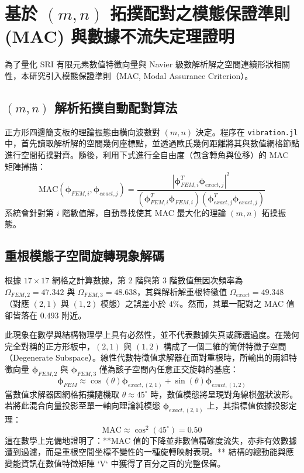 \section{基於 $(m,n)$ 拓撲配對之模態保證準則 (MAC) 與數據不流失定理證明}

為了量化 SRI 有限元素數值特徵向量與 Navier 級數解析解之空間連續形狀相關性，本研究引入模態保證準則（MAC, Modal Assurance Criterion）。

\subsection{$(m,n)$ 解析拓撲自動配對算法}
正方形四邊簡支板的理論振態由橫向波數對 $(m,n)$ 決定。程序在 \texttt{vibration.jl} 中，首先讀取解析解的空間幾何座標點，並透過歐氏幾何距離將其與數值網格節點進行空間拓撲對齊。隨後，利用下式進行全自由度（包含轉角與位移）的 MAC 矩陣掃描：
\begin{equation}
\text{MAC}(\boldsymbol{\phi}_{FEM, i}, \boldsymbol{\phi}_{exact, j}) = \frac{|\boldsymbol{\phi}_{FEM, i}^T \boldsymbol{\phi}_{exact, j}|^2}{(\boldsymbol{\phi}_{FEM, i}^T \boldsymbol{\phi}_{FEM, i})(\boldsymbol{\phi}_{exact, j}^T \boldsymbol{\phi}_{exact, j})}
\end{equation}
系統會針對第 $i$ 階數值解，自動尋找使其 MAC 最大化的理論 $(m,n)$ 拓撲振態。



\subsection{重根模態子空間旋轉現象解碼}
根據 $17 \times 17$ 網格之計算數據，第 2 階與第 3 階數值無因次頻率為 $\Omega_{FEM,2}=47.342$ 與 $\Omega_{FEM,3}=48.638$，其與解析解重根特徵值 $\Omega_{exact}=49.348$（對應 $(2,1)$ 與 $(1,2)$ 模態）之誤差小於 $4\%$。然而，其單一配對之 MAC 值卻皆落在 $0.493$ 附近。

此現象在數學與結構物理學上具有必然性，並不代表數據失真或篩選過度。在幾何完全對稱的正方形板中，$(2,1)$ 與 $(1,2)$ 構成了一個二維的簡併特徵子空間（Degenerate Subspace）。線性代數特徵值求解器在面對重根時，所輸出的兩組特徵向量 $\boldsymbol{\phi}_{FEM,2}$ 與 $\boldsymbol{\phi}_{FEM,3}$ 僅為該子空間內任意正交旋轉的基底：
\begin{equation}
\boldsymbol{\phi}_{FEM} \approx \cos(\theta)\boldsymbol{\phi}_{exact,(2,1)} + \sin(\theta)\boldsymbol{\phi}_{exact,(1,2)}
\end{equation}
當數值求解器因網格拓撲隨機取 $\theta \approx 45^\circ$ 時，數值模態將呈現對角線棋盤狀波形。若將此混合向量投影至單一軸向理論純模態 $\boldsymbol{\phi}_{exact,(2,1)}$ 上，其指標值依據投影定理：
\begin{equation}
\text{MAC} \approx \cos^2(45^\circ) = 0.50
\end{equation}
這在數學上完備地證明了：**MAC 值的下降並非數值精確度流失，亦非有效數據遭到過濾，而是重根空間坐標不變性的一種旋轉映射表現。** 結構的總動能與應變能資訊在數值特徵矩陣 `V` 中獲得了百分之百的完整保留。
